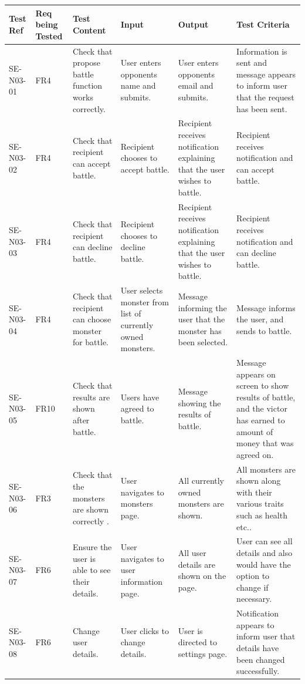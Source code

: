 \documentclass[a4paper]{article}
\begin{document}
\begin{landscape}
\begin{center}
\thispagestyle{empty}
	\begin{tabular}{| l | l | p{3cm} | p{3cm} | p{5cm} | p{7cm} |}
	\hline
	Test Ref & Req being Tested & Test Content & Input & Output & Test Criteria \\ \hline
	
	SE-N03-01 & FR4 & Check that propose battle function works correctly. & User enters opponents name and submits. & User enters opponents email and submits. & Information is sent and message appears to inform user that the request  has been sent.\\
	\hline
	SE-N03-02 & FR4 & Check that recipient can accept battle. & Recipient chooses to accept battle. & Recipient receives notification explaining that the user wishes to battle. & Recipient receives notification and can accept battle.\\
	\hline
	SE-N03-03 & FR4 & Check that recipient can decline battle. & Recipient chooses to decline battle. & Recipient receives notification explaining that the user wishes to battle. & Recipient receives notification and can decline battle.\\
	\hline
	SE-N03-04 & FR4 &Check that recipient can choose monster for battle. & User selects monster from list of currently owned monsters. & Message informing the user that the monster has been selected. & Message informs the user, and sends to battle.\\
	\hline
	SE-N03-05 & FR10 & Check that results are shown after battle. & Users have agreed to battle. & Message showing the results of battle. & Message appears on screen to show results of battle, and the victor has earned to amount of money that was agreed on.\\
	\hline
	SE-N03-06 & FR3& Check that the monsters are shown correctly . &User navigates to monsters page. & All currently owned monsters are shown. & All monsters are shown along with their various traits such as health etc..\\
	\hline
	SE-N03-07 & FR6 & Ensure the user is able to see their details. & User navigates to user information page. & All user details are shown on the page. & User can see all details and also would have the option to change if necessary.\\
	\hline
	SE-N03-08 & FR6 & Change user details. &User clicks to change details. & User is directed to settings page. & Notification appears to inform user that details have been changed successfully.\\

\end{tabular}
\end{center}
\end{landscape}
\end{document}

